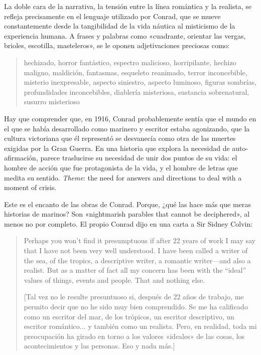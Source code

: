 \documentclass[a4paper, 12pt]{article}
\begin{document}
La doble cara de la narrativa, la tensión entre la línea romántica y la
realista, se refleja precisamente en el lenguaje utilizado por Conrad, que se
mueve constantemente desde la tangibilidad de la vida náutica al misticismo de
la experiencia humana. A frases y palabras como «cuadrante, orientar las vergas,
brioles, escotilla, masteleros», se le oponen adjetivaciones preciosas como:

\begin{quote}
    hechizado, horror fantástico, espectro malicioso, horripilante, hechizo
    maligno, maldición, fantasmas, esqueleto reanimado, terror inconcebible,
    misterio inexpresable, aspecto siniestro, aspecto luminoso, figuras
    sombrías, profundidades inconcebibles, diablería misteriosa, sustancia
    sobrenatural, susurro misterioso
\end{quote}

Hay que comprender que, en 1916, Conrad probablemente sentía que el mundo en el
que se había desarrollado como marinero y escritor estaba agonizando, que la
cultura victoriana que él representó se desvanecía como otra de las muertes
exigidas por la Gran Guerra. En una historia que explora la necesidad de
auto-afirmación, parece traslucirse su necesidad de unir dos puntos de su vida:
el hombre de acción que fue protagonista de la vida, y el hombre de letras que
medita su sentido. \textit{Theme}: the need for answers and directions to deal
with a moment of crisis.


Este es el encanto de las obras de Conrad. Porque, ¿qué las hace más que meras
historias de marinos? Son «nightmarish parables that cannot be deciphered», al
menos no por completo. El propio Conrad dijo en una carta a Sir Sidney Colvin:

\begin{quote}
     Perhaps you won’t find it presumptuous if after 22 years of work I may say
     that I have not been very well understood. I have been called a writer of
     the sea, of the tropics, a descriptive writer, a romantic writer—and also a
     realist. But as a matter of fact all my concern has been with the “ideal”
     values of things, events and people. That and nothing else.

     [Tal vez no le resulte presuntuoso si, después de 22 años de trabajo, me
     permito decir que no he sido muy bien comprendido. Se me ha calificado como
     un escritor del mar, de los trópicos, un escritor descriptivo, un escritor
     romántico... y también como un realista. Pero, en realidad, toda mi
     preocupación ha girado en torno a los valores «ideales» de las cosas, los
     acontecimientos y las personas. Eso y nada más.]
\end{quote}
\end{document}
